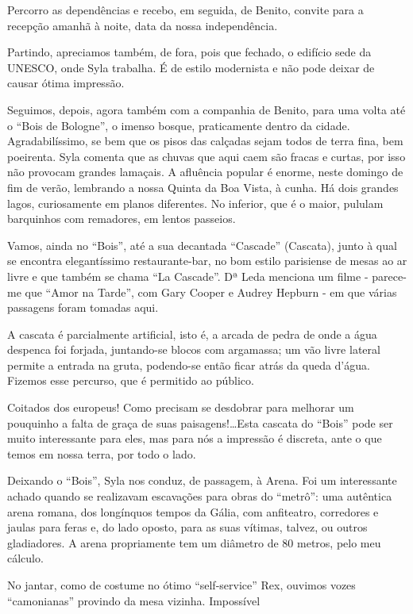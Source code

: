 Percorro as dependências e recebo, em seguida, de Benito, convite para a recepção amanhã à noite, data da nossa independência.

Partindo, apreciamos também, de fora, pois que fechado, o edifício sede da UNESCO, onde Syla trabalha. É de estilo modernista e não pode deixar de causar ótima impressão.

Seguimos, depois, agora também com a companhia de Benito, para uma volta até o “Bois de Bologne”, o imenso bosque, praticamente dentro da cidade. Agradabilíssimo, se bem que os pisos das calçadas sejam todos de terra fina, bem poeirenta. Syla comenta que as chuvas que aqui caem são fracas e curtas, por isso não provocam grandes lamaçais. A afluência popular é enorme, neste domingo de fim de verão, lembrando a nossa Quinta da Boa Vista, à cunha. Há dois grandes lagos, curiosamente em planos diferentes. No inferior, que é o maior, pululam barquinhos com remadores, em lentos passeios.

Vamos, ainda no “Bois”, até a sua decantada “Cascade” (Cascata), junto à qual se encontra elegantíssimo restaurante-bar, no bom estilo parisiense de mesas ao ar livre e que também se chama “La Cascade”. Dª Leda menciona um filme - parece-me que “Amor na Tarde”, com Gary Cooper e Audrey Hepburn - em que várias passagens foram tomadas aqui.

A cascata é parcialmente artificial, isto é, a arcada de pedra de onde a água despenca foi forjada, juntando-se blocos com argamassa; um vão livre lateral permite a entrada na gruta, podendo-se então ficar atrás da queda d’água. Fizemos esse percurso, que é permitido ao público.

Coitados dos europeus! Como precisam se desdobrar para melhorar um pouquinho a falta de graça de suas paisagens!\ldots Esta cascata do “Bois” pode ser muito interessante para eles, mas para nós a impressão é discreta, ante o que temos em nossa terra, por todo o lado.

Deixando o “Bois”, Syla nos conduz, de passagem, à Arena. Foi um interessante achado quando se realizavam escavações para obras do “metrô”: uma autêntica arena romana, dos longínquos tempos da Gália, com anfiteatro, corredores e jaulas para feras e, do lado oposto, para as suas vítimas, talvez, ou outros gladiadores. A arena propriamente tem um diâmetro de 80 metros, pelo meu cálculo.

No jantar, como de costume no ótimo “self-service” Rex, ouvimos vozes “camonianas” provindo da mesa vizinha. Impossível

